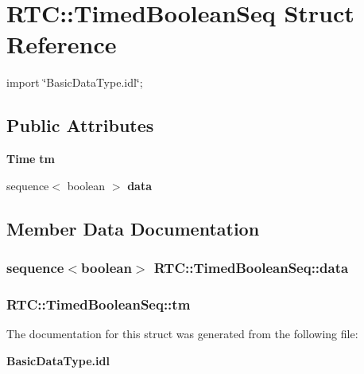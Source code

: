 \section{RTC::TimedBooleanSeq Struct Reference}
\label{structRTC_1_1TimedBooleanSeq}


{\ttfamily import \char`\"{}BasicDataType.idl\char`\"{};}

\subsection*{Public Attributes}
\begin{DoxyCompactItemize}
\item 
{\bf Time} {\bf tm}
\item 
sequence$<$ boolean $>$ {\bf data}
\end{DoxyCompactItemize}


\subsection{Member Data Documentation}
\subsubsection[{data}]{\setlength{\rightskip}{0pt plus 5cm}sequence$<$boolean$>$ {\bf RTC::TimedBooleanSeq::data}}\label{structRTC_1_1TimedBooleanSeq_aae5d5a31e52ad9059ecc9eb7d9db8f01}
\subsubsection[{tm}]{ {\bf RTC::TimedBooleanSeq::tm}}\label{structRTC_1_1TimedBooleanSeq_a79569ec043f6684c520ec5abf81d1933}


The documentation for this struct was generated from the following file:\begin{DoxyCompactItemize}
\item 
{\bf BasicDataType.idl}\end{DoxyCompactItemize}
